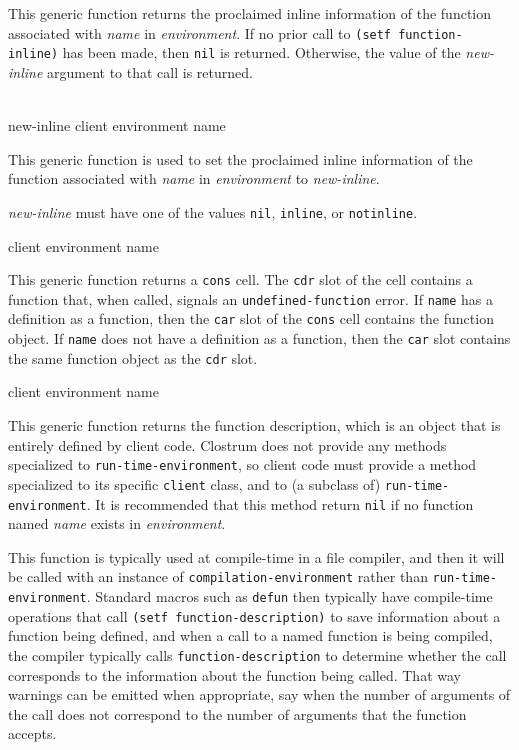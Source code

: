 This generic function returns the proclaimed inline information of the
function associated with \textit{name} in \textit{environment}.  If no
prior call to \texttt{(setf function-inline)} has been made, then
\texttt{nil} is returned.  Otherwise, the value of the
\textit{new-inline} argument to that call is returned.

\\
{new-inline client environment name}

This generic function is used to set the proclaimed inline information
of the function associated with \textit{name} in
\textit{environment} to \textit{new-inline}.

\textit{new-inline} must have one of the values \texttt{nil},
\texttt{inline}, or \texttt{notinline}.

 {client environment name}

This generic function returns a \texttt{cons} cell.  The \texttt{cdr}
slot of the cell contains a function that, when called, signals an
\texttt{undefined-function} error.  If \texttt{name} has a
definition as a function, then the \texttt{car} slot of the \texttt{cons}
cell contains the function object.  If \texttt{name} does not
have a definition as a function, then the \texttt{car} slot contains
the same function object as the \texttt{cdr} slot.

 {client environment name}

This generic function returns the function description, which is an
object that is entirely defined by client code.  Clostrum does not
provide any methods specialized to \texttt{run-time-environment}, so
client code must provide a method specialized to its specific
\texttt{client} class, and to (a subclass of)
\texttt{run-time-environment}.  It is recommended that this method
return \texttt{nil} if no function named \textit{name} exists
in \textit{environment}.

This function is typically used at compile-time in a file compiler,
and then it will be called with an instance of
\texttt{compilation-environment} rather than
\texttt{run-time-environment}.  Standard macros such as \texttt{defun}
then typically have compile-time operations that call \texttt{(setf
  function-description)} to save information about a function being
defined, and when a call to a named function is being compiled, the
compiler typically calls \texttt{function-description} to determine
whether the call corresponds to the information about the function
being called.  That way warnings can be emitted when appropriate, say
when the number of arguments of the call does not correspond to the
number of arguments that the function accepts.

